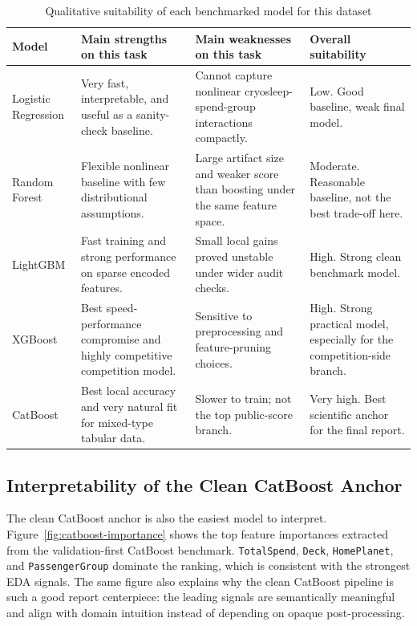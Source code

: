 \documentclass[conference]{IEEEtran}
\begin{document}
\begin{table}[!t]
\caption{Qualitative suitability of each benchmarked model for this dataset}
\label{tab:model-suitability}
\centering
\scriptsize
\begin{tabularx}{\textwidth}{>{\raggedright\arraybackslash}p{}X X X}
\toprule
Model & Main strengths on this task & Main weaknesses on this task & Overall suitability \\
\midrule
Logistic Regression & Very fast, interpretable, and useful as a sanity-check baseline. & Cannot capture nonlinear cryosleep-spend-group interactions compactly. & Low. Good baseline, weak final model. \\
Random Forest & Flexible nonlinear baseline with few distributional assumptions. & Large artifact size and weaker score than boosting under the same feature space. & Moderate. Reasonable baseline, not the best trade-off here. \\
LightGBM & Fast training and strong performance on sparse encoded features. & Small local gains proved unstable under wider audit checks. & High. Strong clean benchmark model. \\
XGBoost & Best speed-performance compromise and highly competitive competition model. & Sensitive to preprocessing and feature-pruning choices. & High. Strong practical model, especially for the competition-side branch. \\
CatBoost & Best local accuracy and very natural fit for mixed-type tabular data. & Slower to train; not the top public-score branch. & Very high. Best scientific anchor for the final report. \\
\bottomrule
\end{tabularx}
\end{table}

\subsection{Interpretability of the Clean CatBoost Anchor}
The clean CatBoost anchor is also the easiest model to interpret. Figure~\ref{fig:catboost-importance} shows the top feature importances extracted from the validation-first CatBoost benchmark. \texttt{TotalSpend}, \texttt{Deck}, \texttt{HomePlanet}, and \texttt{PassengerGroup} dominate the ranking, which is consistent with the strongest EDA signals. The same figure also explains why the clean CatBoost pipeline is such a good report centerpiece: the leading signals are semantically meaningful and align with domain intuition instead of depending on opaque post-processing.
\end{document}
